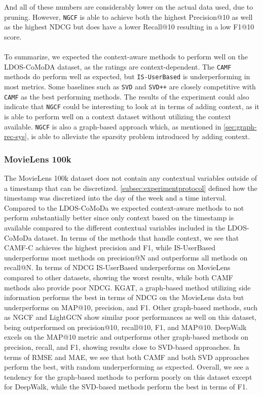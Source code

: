 And all of these numbers are considerably lower on the actual data used, due to pruning.
However, \texttt{NGCF} is able to achieve both the highest Precision@10 as well as the highest NDCG but does have a lower Recall@10 resulting in a low F1@10 score.
\\\\
To summarize, we expected the context-aware methods to perform well on the LDOS-CoMoDA dataset, as the ratings are context-dependent. 
The \texttt{CAMF} methods do perform well as expected, but \texttt{IS-UserBased} is underperforming in most metrics.
Some baselines such as \texttt{SVD} and \texttt{SVD++} are closely competitive with \texttt{CAMF} as the best performing methods.
The results of the experiment could also indicate that \texttt{NGCF} could be interesting to look at in terms of adding context, as it is able to perform well on a context dataset without utilizing the context available. 
\texttt{NGCF} is also a graph-based approach which, as mentioned in \autoref{sec:graph-rec-sys}, is able to alleviate the sparsity problem introduced by adding context.

\subsubsection{MovieLens 100k}
The MovieLens 100k dataset does not contain any contextual variables outside of a timestamp that can be discretized.
\autoref{subsec:experimentprotocol} defined how the timestamp was discretized into the day of the week and a time interval.
Compared to the LDOS-CoMoDa we expected context-aware methods to not perform substantially better since only context based on the timestamp is available compared to the different contextual variables included in the LDOS-CoMoDa dataset. 
In terms of the methods that handle context, we see that CAMF-C achieves the highest precision and F1, while IS-UserBased underperforms most methods on precision@N and outperforms all methods on recall@N.
In terms of NDCG IS-UserBased underperforms on MovieLens compared to other datasets, showing the worst results, while both CAMF methods also provide poor NDCG.
KGAT, a graph-based method utilizing side information performs the best in terms of NDCG on the MovieLens data but underperforms on MAP@10, precision, and F1.
Other graph-based methods, such as NGCF and LightGCN show similar poor performances as well on this dataset, being outperformed on precision@10, recall@10, F1, and MAP@10.
DeepWalk excels on the MAP@10 metric and outperforms other graph-based methods on precision, recall, and F1, showing results close to SVD-based approaches.
In terms of RMSE and MAE, we see that both CAMF and both SVD approaches perform the best, with random underperforming as expected.
Overall, we see a tendency for the graph-based methods to perform poorly on this dataset except for DeepWalk, while the SVD-based methods perform the best in terms of F1.

